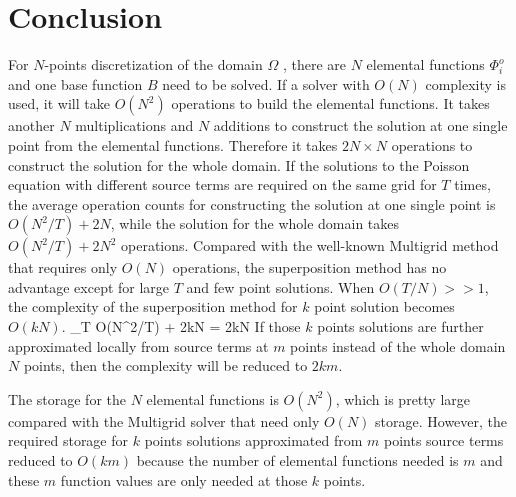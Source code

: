 \section{Conclusion}
For $N$-points discretization of the domain $\Omega$ , there are $N$ elemental functions $\Phi^o_i$ and one base function $B$ need to be solved.
If a solver with $O(N)$ complexity is used, it will take $O(N^2)$ operations to build the elemental functions. It takes another $N$ multiplications and $N$ additions to construct the solution at one single point from the elemental functions. Therefore it takes $2N \times N$ operations to construct the solution for the whole domain. If the solutions to the Poisson equation with different source terms are required on the same grid for $T$ times, the average operation counts for constructing the solution at one single point is $O({N^2}/{T}) + 2N$, while the solution for the whole domain takes $O({N^2}/{T}) + 2N^2$ operations.
Compared with the well-known Multigrid method that requires only $O(N)$ operations, the superposition method has no advantage except for large $T$ and few point solutions. When $O(T/N)>>1$, the complexity of the superposition method for $k$ point solution becomes $O(kN)$. %
\be
\mathop {\lim }\limits_{T \to \infty} O({N^2}/{T}) + 2kN = 2kN
\ee
If those $k$ points solutions are further approximated locally from source terms at $m$ points instead of the whole domain $N$ points, then the complexity will be reduced to $2km$.

The storage for the $N$ elemental functions is $O(N^2)$, which is pretty large compared with the Multigrid solver that need only $O(N)$ storage. However, the required storage for $k$ points solutions approximated from $m$ points source terms reduced to $O(km)$ because the number of elemental functions needed is $m$ and these $m$ function values are only needed at those $k$ points.


